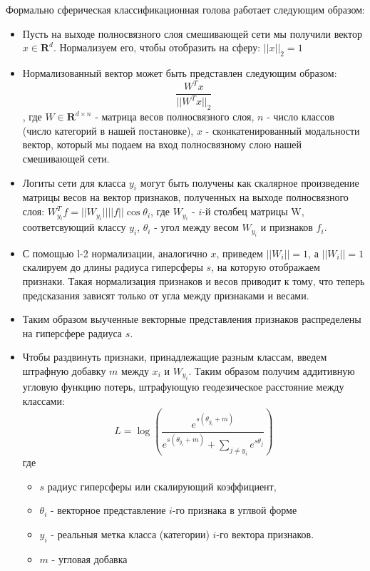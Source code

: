 \documentclass{article}
\begin{document}
\par Формально сферическая классификационная голова работает следующим образом:
\begin{itemize}
    \item Пусть на выходе полносвязного слоя смешивающей сети мы получили вектор $x \in \mathbf{R}^d$. Нормализуем его, чтобы отобразить на сферу: $||x||_2 = 1$
    \item Нормализованный вектор может быть представлен следующим образом: $$\frac{W^Tx}{||W^Tx||_2}$$, где $W \in \mathbf{R}^{d \times n}$ - матрица весов полносвязного слоя, $n$ - число классов (число категорий в нашей постановке), $x$ - сконкатенированный модальности вектор, который мы подаем на вход полносвязному слою нашей смешивающей сети. 
    \item Логиты сети для класса $y_i$ могут быть получены как  скалярное произведение матрицы весов на вектор признаков, полученных на выходе полносвязного слоя: $W_{y_i}^Tf = ||W_{y_i}||||f||\cos\theta_i$, где $W_{y_i}$ - $i$-й столбец матрицы W, соответсвующий классу $y_i$, $\theta_i$ - угол между весом $W_{y_i}$ и признаков $f_i$.
    \item С помощью l-2 нормализации, аналогично $x$, приведем $||W_i||=1$, а $||W_i||=1$ скалируем до длины радиуса гиперсферы $s$, на которую отображаем признаки. Такая нормализация признаков и весов приводит к тому, что теперь предсказания зависят только от угла между признаками и весами. 
    \item Таким образом выученные векторные представления признаков распределены на гиперсфере радиуса $s$.
    \item Чтобы раздвинуть признаки, принадлежащие разным классам, введем штрафную добавку $m$ между $x_i$ и $W_{y_i}$. Таким образом получим аддитивную угловую функцию потерь, штрафующую геодезическое расстояние между классами:
    $$L = \log\left(\frac{e^{s(\theta_{y_i} + m)}}{e^{s(\theta_{y_i} + m)} + \sum_{j \neq y_i} e^{s \theta_j}}\right)$$
где 
\begin{itemize}
  \item \(s\) радиус гиперсферы или скалирующий коэффициент,
  \item \(\theta_i\) - векторное представление $i$-го признака в углвой форме
  \item \(y_i\) - реальныя метка класса (категории) \(i\)-го вектора признаков.
  \item \(m\) - угловая добавка
\end{itemize}

\end{itemize}
\end{document}
